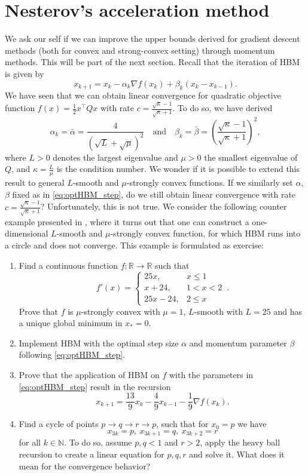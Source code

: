 \documentclass[12pt,openany]{book}
\theoremstyle{definition}
\theoremstyle{definition}
\newcommand{\N}{\mathbb{N}}
\newcommand{\R}{\mathbb{R}}
\begin{document}
\section{Nesterov's acceleration method}
We ask our self if we can improve the upper bounds derived for gradient descent methods (both for convex and strong-convex setting) through momentum methods. This will be part of the next section. Recall that the iteration of HBM is given by
\[ x_{k+1} = x_k-\alpha_k\nabla f(x_k) +\beta_k (x_k-x_{k-1}).\]
We have seen that we can obtain linear convergence for quadratic objective function $f(x) = \frac12 x^\top Qx$ with rate $c=\frac{\sqrt{\kappa}-1}{\sqrt{\kappa}+1}$. To do so, we have derived 
\begin{equation}\label{eq:optHBM_step}
\alpha_k=\bar\alpha = \frac{4}{(\sqrt{L}+\sqrt{\mu})^2}\quad \text{and}\quad \beta_k= \bar\beta = \left( \frac{\sqrt{\kappa}-1}{\sqrt{\kappa} + 1}\right)^2, 
\end{equation}
where $L>0$ denotes the largest eigenvalue and $\mu>0$ the smallest eigenvalue of $Q$, and $\kappa=\frac{L}{\mu}$ is the condition number. We wonder if it is possible to extend this result to general $L$-smooth and $\mu$-strongly convex functions. If we similarly set $\alpha$, $\beta$ fixed as in \eqref{eq:optHBM_step}, do we still obtain linear convergence with rate $c=\frac{\sqrt{\kappa}-1}{\sqrt{\kappa}+1}$? Unfortunately, this is not true.  We consider the following counter example presented in \cite{Lessard2016}, where it turns out that one can construct a one-dimensional $L$-smooth and $\mu$-strongly convex function, for which HBM runs into a circle and does not converge. This example is formulated as exercise:
\begin{exercise}
\begin{enumerate}
\item Find a continuous function $f:\R\to\R$ such that
\[f'(x) = \begin{cases} 25x, &x\le 1\\
x+24, &1< x<2\\
25x-24, &2\le x 
\end{cases}\, . \]
Prove that $f$ is $\mu$-strongly convex with $\mu=1$, $L$-smooth with $L=25$ and has a unique global minimum in $x_\ast=0$.
\item Implement HBM with the optimal step size $\alpha$ and momentum parameter $\beta$ following \eqref{eq:optHBM_step}.
\item Prove that the application of HBM on $f$ with the parameters in \eqref{eq:optHBM_step} result in the recursion
\[x_{k+1} = \frac{13}{9} x_k - \frac{4}{9} x_{k-1} - \frac{1}{9}\nabla f(x_k). \]
\item Find a cycle of points $p\to q\to r\to p$, such that for $x_0=p$ we have 
\[x_{3k} = p,\ x_{3k+1} = q, \ x_{3k+2} = r \]
for all $k\in\N$. To do so, assume $p,q<1$ and $r>2$, apply the heavy ball recursion to create a linear equation for $p,q,r$ and solve it. What does it mean for the convergence behavior?
\end{enumerate}
\end{exercise}
\end{document}
